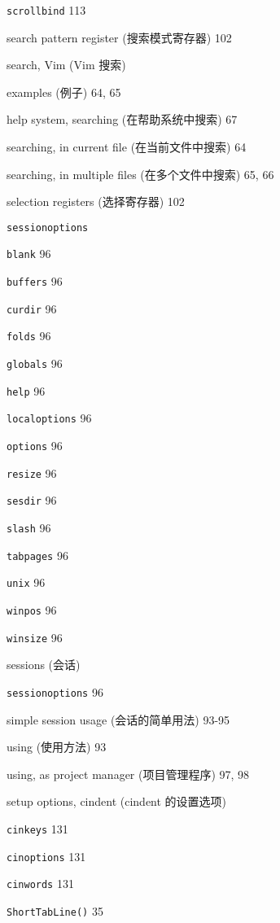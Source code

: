 \begin{multicols}{2}
\texttt{scrollbind} 113

search pattern register (搜索模式寄存器) 102

search, Vim (Vim 搜索) \par
  examples (例子) 64, 65 \par
  help system, searching (在帮助系统中搜索) 67 \par
  searching, in current file (在当前文件中搜索) 64 \par
  searching, in multiple files (在多个文件中搜索) 65, 66 \par

selection registers (选择寄存器) 102

\texttt{sessionoptions} \par
  \texttt{blank} 96 \par
  \texttt{buffers} 96 \par
  \texttt{curdir} 96 \par
  \texttt{folds} 96 \par
  \texttt{globals} 96 \par
  \texttt{help} 96 \par
  \texttt{localoptions} 96 \par
  \texttt{options} 96 \par
  \texttt{resize} 96 \par
  \texttt{sesdir} 96 \par
  \texttt{slash} 96 \par
  \texttt{tabpages} 96 \par
  \texttt{unix} 96 \par
  \texttt{winpos} 96 \par
  \texttt{winsize} 96 \par

sessions (会话) \par
  \texttt{sessionoptions} 96 \par
  simple session usage (会话的简单用法) 93-95 \par
  using (使用方法) 93 \par
  using, as project manager (项目管理程序) 97, 98 \par

setup options, cindent (cindent 的设置选项) \par
  \texttt{cinkeys} 131 \par
  \texttt{cinoptions} 131 \par
  \texttt{cinwords} 131 \par

\texttt{ShortTabLine()} 35


\end{multicols}
